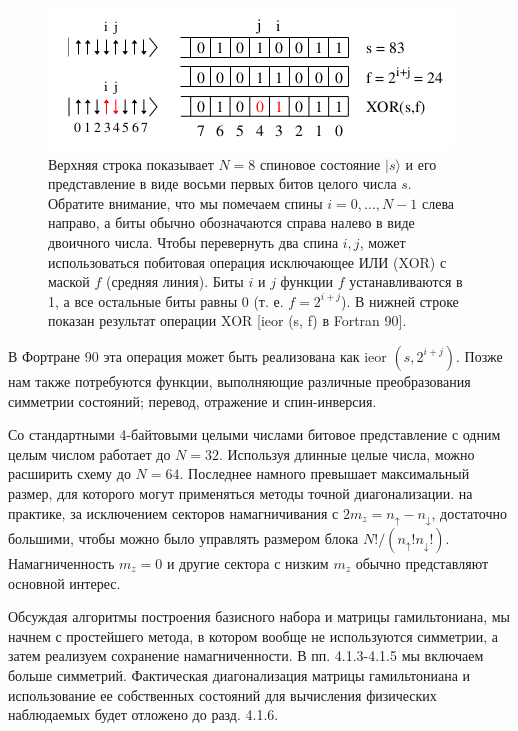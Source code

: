\documentclass[11pt]{article}
\begin{document}
\begin{figure}[htp]
\centering
\includegraphics[scale=0.5]{fig26}
\caption{Верхняя строка показывает $N = 8$ спиновое состояние $| s \rangle$ и его представление в виде восьми первых битов целого числа $s$. Обратите внимание, что мы помечаем спины $i = 0,\dots, N - 1$ слева направо, а биты обычно обозначаются справа налево в виде двоичного числа. Чтобы перевернуть два спина $i, j$, может использоваться побитовая операция исключающее ИЛИ (XOR) с маской $f$ (средняя линия). Биты $i$ и $j$ функции $f$ устанавливаются в 1, а все остальные биты равны 0 (т. е. $f = 2^{i + j}$). В нижней строке показан результат операции XOR [ieor (s, f) в Fortran 90].}
\label{}
\end{figure}

В Фортране 90 эта операция может быть реализована как ieor $(s, 2^{ i + j})$. Позже нам также потребуются функции, выполняющие различные преобразования симметрии состояний; перевод, отражение и спин-инверсия.

Со стандартными 4-байтовыми целыми числами битовое представление с одним целым числом работает до $N = 32$. Используя длинные целые числа, можно расширить схему до $N = 64$. Последнее намного превышает максимальный размер, для которого могут применяться методы точной диагонализации. на практике, за исключением секторов намагничивания с $2m_z = n_↑ - n_↓$, достаточно большими, чтобы можно было управлять размером блока $N! / (n_↑! n_↓!)$. Намагниченность $m_z = 0$ и другие сектора с низким $m_z$ обычно представляют основной интерес.

Обсуждая алгоритмы построения базисного набора и матрицы гамильтониана, мы начнем с простейшего метода, в котором вообще не используются симметрии, а затем реализуем сохранение намагниченности. В пп. 4.1.3-4.1.5 мы включаем больше симметрий. Фактическая диагонализация матрицы гамильтониана и использование ее собственных состояний для вычисления физических наблюдаемых будет отложено до разд. 4.1.6.
\end{document}
